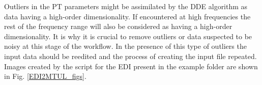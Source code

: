 \documentclass[]{scrartcl}
\begin{document}
	Outliers in the PT parameters might be assimilated by the DDE algorithm as data having a high-order dimensionality. If encountered at high frequencies the rest of the frequency range will also be considered as having a high-order dimensionality. It is why it is crucial to remove outliers or data suspected to be noisy at this stage of the workflow. In the presence of this type of outliers the input data should be reedited and the process of creating the input file repeated. Images created by the script for the EDI present in the example folder are shown in Fig. \ref{EDI2MTUL_figs}.
	
	
	
\end{document}
